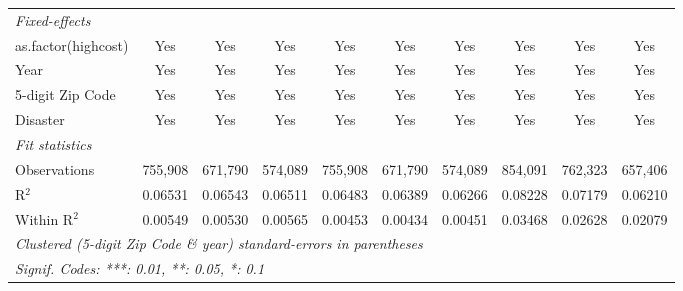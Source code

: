 \begin{tabular}{lccccccccc}
   \midrule
   \emph{Fixed-effects}\\
   as.factor(highcost)                                        & Yes            & Yes                   & Yes           & Yes           & Yes            & Yes          & Yes            & Yes            & Yes\\  
   Year                                                       & Yes            & Yes                   & Yes           & Yes           & Yes            & Yes          & Yes            & Yes            & Yes\\  
   5-digit Zip Code                                           & Yes            & Yes                   & Yes           & Yes           & Yes            & Yes          & Yes            & Yes            & Yes\\  
   Disaster                                                   & Yes            & Yes                   & Yes           & Yes           & Yes            & Yes          & Yes            & Yes            & Yes\\  
   \midrule
   \emph{Fit statistics}\\
   Observations                                               & 755,908        & 671,790               & 574,089       & 755,908       & 671,790        & 574,089      & 854,091        & 762,323        & 657,406\\  
   R$^2$                                                      & 0.06531        & 0.06543               & 0.06511       & 0.06483       & 0.06389        & 0.06266      & 0.08228        & 0.07179        & 0.06210\\  
   Within R$^2$                                               & 0.00549        & 0.00530               & 0.00565       & 0.00453       & 0.00434        & 0.00451      & 0.03468        & 0.02628        & 0.02079\\  
   \midrule \midrule
   \multicolumn{10}{l}{\emph{Clustered (5-digit Zip Code \& year) standard-errors in parentheses}}\\
   \multicolumn{10}{l}{\emph{Signif. Codes: ***: 0.01, **: 0.05, *: 0.1}}\\
\end{tabular}
\par\endgroup
